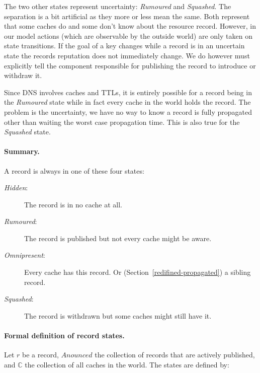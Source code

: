 \documentclass[twoside,english, a4paper]{article}
\begin{document}
The two other states represent uncertainty: \emph{Rumoured} and \emph
{Squashed}. The separation is a bit artificial as they more or less 
mean the same. Both represent that some caches do and some don't 
know about the resource record. However, in our model actions (which 
are observable by the outside world) are only taken on state 
transitions. If the goal of a key changes while a record is in an 
uncertain state the records reputation does not immediately change. We 
do however must explicitly tell the component responsible for 
publishing the record to introduce or withdraw it. 

Since DNS involves caches and TTLs, it is entirely possible for a 
record being in the \emph{Rumoured} state while in fact every cache 
in the world holds the record. The problem is the uncertainty, we have
no way to know a record is fully propagated other than waiting the
worst case propagation time. This is also true for the \emph{Squashed}
state.

\paragraph{Summary.} A record is always in one of these four states:

\begin{description}
       \item[\emph{Hidden}:] 		
			The record is in no cache at all.
       \item[\emph{Rumoured}:] 		
			The record is published but not every cache might be aware.
       \item[\emph{Omnipresent}:]
			Every cache has this record.
			Or (Section~\ref{redifined-propagated}) a
			sibling record.
       \item[\emph{Squashed}:]
			The record is withdrawn but some caches might still have it.
\end{description} 

\paragraph{Formal definition of record states.} Let $r$ be a record, $Anounced$ the 
collection of records that are actively published, and $\mathbb{C}$
the collection of all caches in the world. The states are defined by:
\end{document}
